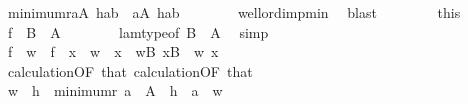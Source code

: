 \begin{isabellebody}
\ {\isachardoublequoteopen}minimum{\isacharparenleft}{\kern0pt}r{\isacharcomma}{\kern0pt}{\isacharbraceleft}{\kern0pt}a{\isasymin}A{\isachardot}{\kern0pt}\ h{\isacharbackquote}{\kern0pt}a{\isacharequal}{\kern0pt}b{\isacharbraceright}{\kern0pt}{\isacharparenright}{\kern0pt}\ {\isasymin}\ {\isacharbraceleft}{\kern0pt}a{\isasymin}A{\isachardot}{\kern0pt}\ h{\isacharbackquote}{\kern0pt}a{\isacharequal}{\kern0pt}b{\isacharbraceright}{\kern0pt}{\isachardoublequoteclose}\isanewline
\ \ \ \ \ \ \isamarkupfalse%
\ well{\isacharunderscore}{\kern0pt}ord{\isacharunderscore}{\kern0pt}imp{\isacharunderscore}{\kern0pt}min\ \isamarkupfalse%
\ blast\isanewline
\ \ \isamarkupfalse%
\isanewline
\ \ \isamarkupfalse%
\ \isamarkupfalse%
\ this\isanewline
\ \ \isamarkupfalse%
\ {\isachardoublequoteopen}{\isacharquery}{\kern0pt}f\ {\isacharcolon}{\kern0pt}\ B\ {\isasymrightarrow}\ A{\isachardoublequoteclose}\isanewline
\ \ \ \ \ \ \isamarkupfalse%
\ lam{\isacharunderscore}{\kern0pt}type{\isacharbrackleft}{\kern0pt}of\ B\ {\isacharunderscore}{\kern0pt}\ {\isachardoublequoteopen}{\isasymlambda}{\isacharunderscore}{\kern0pt}{\isachardot}{\kern0pt}A{\isachardoublequoteclose}{\isacharbrackright}{\kern0pt}\ \isamarkupfalse%
\ simp\isanewline
\ \ \isamarkupfalse%
\ \isanewline
\ \ \isamarkupfalse%
\ {\isachardoublequoteopen}{\isacharquery}{\kern0pt}f\ {\isacharbackquote}{\kern0pt}\ w\ {\isacharequal}{\kern0pt}\ {\isacharquery}{\kern0pt}f\ {\isacharbackquote}{\kern0pt}\ x\ {\isasymLongrightarrow}\ w\ {\isacharequal}{\kern0pt}\ x{\isachardoublequoteclose}\ \ {\isachardoublequoteopen}w{\isasymin}B{\isachardoublequoteclose}\ {\isachardoublequoteopen}x{\isasymin}B{\isachardoublequoteclose}\ \ w\ x\isanewline
\ \ \isamarkupfalse%
\ {\isacharminus}{\kern0pt}\isanewline
\ \ \ \ \isamarkupfalse%
\ calculation{\isacharparenleft}{\kern0pt}{}{\isacharparenright}{\kern0pt}{\isacharbrackleft}{\kern0pt}OF\ that{\isacharparenleft}{\kern0pt}{}{\isacharparenright}{\kern0pt}{\isacharbrackright}{\kern0pt}\ calculation{\isacharparenleft}{\kern0pt}{}{\isacharparenright}{\kern0pt}{\isacharbrackleft}{\kern0pt}OF\ that{\isacharparenleft}{\kern0pt}{}{\isacharparenright}{\kern0pt}{\isacharbrackright}{\kern0pt}\isanewline
\ \ \ \ \isamarkupfalse%
\ {\isachardoublequoteopen}w\ {\isacharequal}{\kern0pt}\ h\ {\isacharbackquote}{\kern0pt}\ minimum{\isacharparenleft}{\kern0pt}r{\isacharcomma}{\kern0pt}\ {\isacharbraceleft}{\kern0pt}a\ {\isasymin}\ A\ {\isachardot}{\kern0pt}\ h\ {\isacharbackquote}{\kern0pt}\ a\ {\isacharequal}{\kern0pt}\ w{\isacharbraceright}{\kern0pt}{\isacharparenright}{\kern0pt}{\isachardoublequoteclose}\isanewline

\end{isabellebody}
